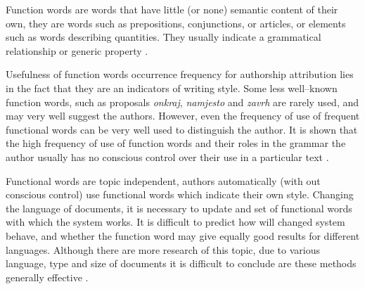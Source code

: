 \documentclass[11pt,english]{article}
\begin{document}
\begin{multicols}{2}
Function words are words that have little (or none) semantic content of their
own, they are words such as prepositions, conjunctions, or articles, or elements
such as words describing quantities. They usually indicate a grammatical
relationship or generic property \citep{zhao2005effective}.

Usefulness of function words occurrence frequency for authorship attribution
lies in the fact that they are an indicators of writing style. Some
less well--known function words, such as proposals \emph{onkraj},
\emph{namjesto} and \emph{zavrh} are rarely used, and may very well
suggest the authors. However, even the frequency of use of frequent
functional words can be very well used to distinguish the author. It is shown
that the high frequency of use of function words and their roles in the grammar
the author usually has no conscious control over their use in a particular text
\citep{argamon2005measuring}.

Functional words are topic independent, authors automatically (with out conscious
control) use functional words which indicate their own style. Changing the
language of documents, it is necessary to update and set of functional words with
which the system works. It is difficult to predict how will changed system
behave, and whether the function word may give equally good results for different
languages. Although there are more research of this topic, due to various
language, type and size of documents it is difficult to conclude are these
methods generally effective \citep{zhao2005effective}.


\end{multicols}
\end{document}
